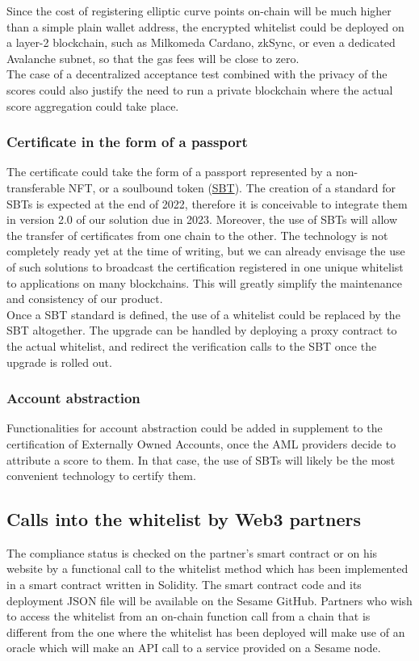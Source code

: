 ﻿\documentclass[a4paper]{article}
\begin{document}
Since the cost of registering elliptic curve points on-chain will be much higher than a simple plain wallet address, the encrypted whitelist could be deployed on a layer-2 blockchain, such as Milkomeda Cardano, zkSync, or even a dedicated Avalanche subnet, so that the gas fees will be close to zero. \\

The case of a decentralized acceptance test combined with the privacy of the scores could also justify the need to run a private blockchain where the actual score aggregation could take place.

\subsubsection{Certificate in the form of a passport}
The certificate could take the form of a passport represented by a non-transferable NFT, or a soulbound token (\href{https://vitalik.ca/general/2022/01/26/soulbound.html}{SBT}). The creation of a standard for SBTs is expected at the end of 2022, therefore it is conceivable to integrate them in version 2.0 of our solution due in 2023. 
Moreover, the use of SBTs will allow the transfer of certificates from one chain to the other. The technology is not completely ready yet at the time of writing, but we can already envisage the use of such solutions to broadcast the certification registered in one unique whitelist to applications on many blockchains. This will greatly simplify the maintenance and consistency of our product. \\

Once a SBT standard is defined, the use of a whitelist could be replaced by the SBT altogether. The upgrade can be handled by deploying a proxy contract to the actual whitelist, and redirect the verification calls to the SBT once the upgrade is rolled out.

\subsubsection{Account abstraction}
Functionalities for account abstraction could be added in supplement to the certification of Externally Owned Accounts, once the AML providers decide to attribute a score to them. In that case, the use of SBTs will likely  be the most convenient technology to certify them.

\subsection{Calls into the whitelist by Web3 partners}
The compliance status is checked on the partner's smart contract or on his website by a functional call to the whitelist method which has been implemented in a smart contract written in Solidity. The smart contract code and its deployment JSON file will be available on the Sesame GitHub.
Partners who wish to access the whitelist from an on-chain function call from a chain that is different from the one where the whitelist has been deployed will make use of an oracle which will make an API call to a service provided on a Sesame node. \\
\end{document}

